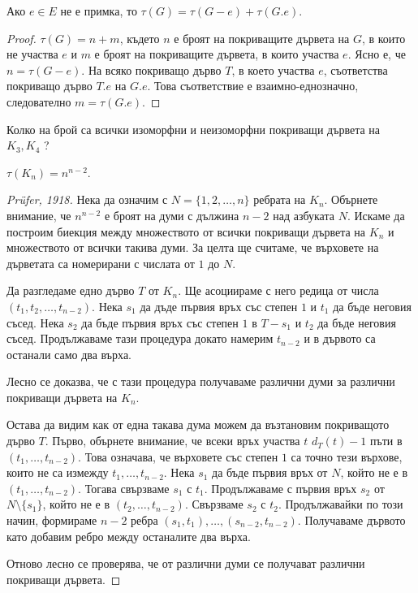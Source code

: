\begin{thm}
  Ако $e\in E$ не е примка, то
  $\tau(G) = \tau(G-e) + \tau(G.e)$.
\end{thm}
\begin{proof}
  $\tau(G) = n + m$, където $n$ е броят на покриващите дървета на $G$, в които не участва $e$
  и $m$ е броят на покриващите дървета, в които участва $e$.
  Ясно е, че $n = \tau(G-e)$.
  На всяко покриващо дърво $T$, в което участва $e$, съответства покриващо дърво $T.e$ на $G.e$.
  Това съответствие е взаимно-еднозначно, следователно $m = \tau(G.e)$.
\end{proof}

\begin{problem}
  Колко на брой са всички изоморфни и неизоморфни покриващи дървета на $K_3,K_4$ ?
\end{problem}

\begin{thm}[Кейли] %
  $\tau(K_n) = n^{n-2}$.
\end{thm}
\begin{proof}[Pr\"ufer, 1918]
  Нека да означим с $N = \{1,2,\dots,n\}$ ребрата на $K_n$.
  Обърнете внимание, че $n^{n-2}$ е броят на думи с дължина $n-2$ над азбуката $N$.
  Искаме да построим биекция между множеството от всички покриващи дървета на $K_n$ 
  и множеството от всички такива думи. За целта ще считаме, че върховете на дърветата
  са номерирани с числата от $1$ до $N$.

  Да разгледаме едно дърво $T$ от $K_n$. Ще асоциираме с него редица от числа $(t_1,t_2,\dots,t_{n-2})$.
  Нека $s_1$ да дъде първия връх със степен $1$ и $t_1$ да бъде неговия съсед.
  Нека $s_2$ да бъде първия връх със степен $1$ в $T - s_1$ и $t_2$ да бъде неговия съсед.
  Продължаваме тази процедура докато намерим $t_{n-2}$ и в дървото са останали само два върха.

  Лесно се доказва, че с тази процедура получаваме различни думи за различни покриващи дървета на $K_n$.
  
  Остава да видим как от една такава дума можем да възтановим покриващото дърво $T$.
  Първо, обърнете внимание, че всеки връх участва $t$ $d_T(t) - 1$ пъти в $(t_1,\dots,t_{n-2})$.
  Това означава, че върховете със степен $1$ са точно тези върхове, които не са измежду $t_1,\dots, t_{n-2}$.
  Нека $s_1$ да бъде първия връх от $N$, който не е в $(t_1,\dots,t_{n-2})$. Тогава свързваме $s_1$ с $t_1$.
  Продължаваме с първия връх $s_2$ от $N\setminus\{s_1\}$, който не е в $(t_2,\dots,t_{n-2})$.
  Свързваме $s_2$ с $t_2$. 
  Продължавайки по този начин, формираме $n-2$ ребра $(s_1,t_1), \dots, (s_{n-2},t_{n-2})$.
  Получаваме дървото като добавим ребро между останалите два върха.

  Отново лесно се проверява, че от различни думи се получават различни покриващи дървета.
\end{proof}

